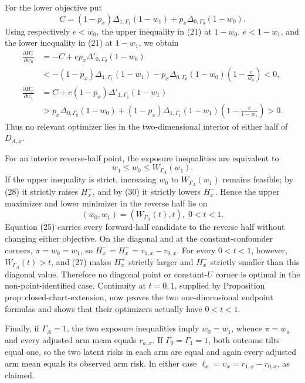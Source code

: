 For the lower objective put
\[
 C=(1-p_x)\Delta_{1,\Gamma_1}(1-w_1)
   +p_x\Delta_{0,\Gamma_0}(1-w_0).
\]
Using respectively \(e<w_0\), the upper inequality in (21) at \(1-w_0\), \(e<1-w_1\), and the lower inequality in (21) at \(1-w_1\), we obtain
\[
\begin{aligned}
 \frac{\partial H_x^-}{\partial w_0}
 &=-C+ep_x\Delta'_{0,\Gamma_0}(1-w_0)\\
 &<-(1-p_x)\Delta_{1,\Gamma_1}(1-w_1)
   -p_x\Delta_{0,\Gamma_0}(1-w_0)\left(1-\frac e{w_0}\right)<0,\\
 \frac{\partial H_x^-}{\partial w_1}
 &=C+e(1-p_x)\Delta'_{1,\Gamma_1}(1-w_1)\\
 &>p_x\Delta_{0,\Gamma_0}(1-w_0)
   +(1-p_x)\Delta_{1,\Gamma_1}(1-w_1)
       \left(1-\frac e{1-w_1}\right)>0.
\end{aligned}
\tag{30}
\]
Thus no relevant optimizer lies in the two-dimensional interior of either half of \(D_{A,x}\).

For an interior reverse-half point, the exposure inequalities are equivalent to
\[
 w_1\leq w_0\leq W_{\Gamma_A}(w_1).
 \tag{31}
\]
If the upper inequality is strict, increasing \(w_0\) to \(W_{\Gamma_A}(w_1)\) remains feasible; by (28) it strictly raises \(H_x^+\), and by (30) it strictly lowers \(H_x^-\).  Hence the upper maximizer and lower minimizer in the reverse half lie on
\[
 (w_0,w_1)=(W_{\Gamma_A}(t),t),\; 0<t<1.
 \tag{32}
\]
Equation (25) carries every forward-half candidate to the reverse half without changing either objective.  On the diagonal and at the constant-confounder corners, \(\pi=w_0=w_1\), so \(H_x^-=H_x^+=r_{1,x}-r_{0,x}\).  For every \(0<t<1\), however, \(W_{\Gamma_A}(t)>t\), and (27) makes \(H_x^+\) strictly larger and \(H_x^-\) strictly smaller than this diagonal value.  Therefore no diagonal point or constant-\(U\) corner is optimal in the non-point-identified case.  Continuity at \(t=0,1\), supplied by Proposition \(\mathrm{prop{:}closed\text{-}chart\text{-}extension}\), now proves the two one-dimensional endpoint formulas and shows that their optimizers actually have \(0<t<1\).

Finally, if \(\Gamma_A=1\), the two exposure inequalities imply \(w_0=w_1\), whence \(\pi=w_a\) and every adjusted arm mean equals \(r_{a,x}\).  If \(\Gamma_0=\Gamma_1=1\), both outcome tilts equal one, so the two latent risks in each arm are equal and again every adjusted arm mean equals its observed arm risk.  In either case \(\ell_x=\upsilon_x=r_{1,x}-r_{0,x}\), as claimed.

